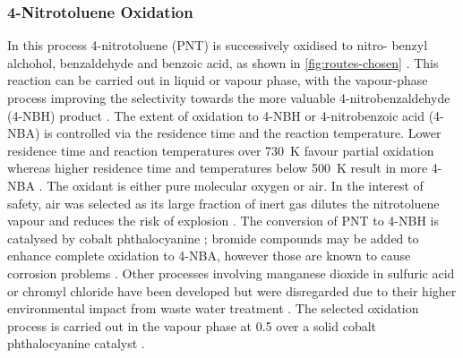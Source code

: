 \subsubsection{4-Nitrotoluene Oxidation}
\label{4-NTox}
In this process 4-nitrotoluene (PNT) is successively oxidised to nitro- benzyl alchohol, benzaldehyde and benzoic acid, as shown in \cref{fig:routes-chosen} \cite{hoorn_modelling_2005}. This reaction can be carried out in liquid or vapour phase, with the vapour-phase process improving the selectivity towards the more valuable 4-nitrobenzaldehyde (4-NBH) product \cite{bruhne_benzaldehyde_2011}. 
The extent of oxidation to 4-NBH or 4-nitrobenzoic acid (4-NBA) is controlled via the residence time and the reaction temperature. Lower residence time and reaction temperatures over \SI{730}{\K} favour partial oxidation whereas higher residence time and temperatures below \SI{500}{\K} result in more 4-NBA \cite{bruhne_benzaldehyde_2011,tan_kinetic_2010}.
The oxidant is either pure molecular oxygen or air. In the interest of safety, air was selected as its large fraction of inert  gas dilutes the nitrotoluene vapour and reduces the risk of explosion \cite{bruhne_benzaldehyde_2011}. 
The conversion of PNT to 4-NBH is catalysed by cobalt phthalocyanine \cite{wendt_reaction_1986}; bromide compounds may be added to enhance complete oxidation to 4-NBA, however those are known to cause corrosion problems \cite{opgrande_benzoic_2003}.
Other processes involving manganese dioxide in sulfuric acid or chromyl chloride have been developed but were disregarded due to their higher environmental impact from waste water treatment \cite{bruhne_benzaldehyde_2011}.
The selected oxidation process is carried out in the vapour phase at \SI{0.5}{\atm} over a solid cobalt phthalocyanine catalyst \cite{chandalia_kinetics_1999}. %



 

